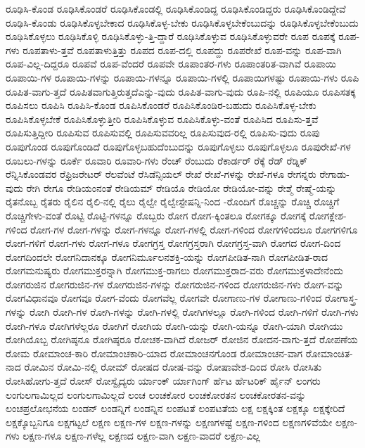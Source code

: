 {ರೂಢಿಸಿ-ಕೊಂಡ
ರೂಢಿಸಿಕೊಂಡರೆ
ರೂಢಿಸಿಕೊಂಡಲ್ಲಿ
ರೂಢಿಸಿಕೊಂಡಿದ್ದ
ರೂಢಿಸಿಕೊಂಡಿದ್ದರು
ರೂಢಿಸಿಕೊಂಡಿದ್ದೇವೆ
ರೂಢಿಸಿ-ಕೊಂಡು
ರೂಢಿಸಿಕೊಳ್ಳಬೇಕಾದ
ರೂಢಿಸಿಕೊಳ್ಳ-ಬೇಕು
ರೂಢಿಸಿಕೊಳ್ಳಬೇಕೆಂಬುದನ್ನು
ರೂಢಿಸಿಕೊಳ್ಳಬೇಕೆಂಬುದು
ರೂಢಿಸಿಕೊಳ್ಳಲು
ರೂಢಿಸಿಕೊಳ್ಳಿ
ರೂಢಿಸಿಕೊಳ್ಳು-ತ್ತಿ-ದ್ದಾರೆ
ರೂಢಿಸಿಕೊಳ್ಳುವ
ರೂಢಿಸಿಕೊಳ್ಳುವರೇ
ರೂಪ
ರೂಪಕ್ಕೆ
ರೂಪ-ಗಳು
ರೂಪತಾಳು-ತ್ತವೆ
ರೂಪತಾಳುತ್ತಿತ್ತು
ರೂಪದ
ರೂಪ-ದಲ್ಲಿ
ರೂಪದ್ದು
ರೂಪರೇಖೆ
ರೂಪ-ವನ್ನು
ರೂಪ-ವಾಗಿ
ರೂಪ-ವಿಲ್ಲ-ದಿದ್ದರೂ
ರೂಪವೆ
ರೂಪ-ವೆಂದರೆ
ರೂಪವೇ
ರೂಪಾಂತರ-ಗಳು
ರೂಪಾಂತರಿತ-ವಾಗಿವೆ
ರೂಪಾಯಿ
ರೂಪಾಯಿ-ಗಳ
ರೂಪಾಯಿ-ಗಳನ್ನು
ರೂಪಾಯಿ-ಗಳನ್ನೂ
ರೂಪಾಯಿ-ಗಳಲ್ಲಿ
ರೂಪಾಯಿಗಳಷ್ಟು
ರೂಪಾಯಿ-ಗಳು
ರೂಪಿ
ರೂಪಿತ-ವಾಗು-ತ್ತದೆ
ರೂಪಿತವಾಗುತ್ತಿರುತ್ತದೆಎನ್ನು-ವುದು
ರೂಪಿತ-ವಾಗು-ವುದು
ರೂಪಿ-ನಲ್ಲಿ
ರೂಪಿಯೂ
ರೂಪಿಸತಕ್ಕ
ರೂಪಿಸಲು
ರೂಪಿಸಿ
ರೂಪಿಸಿ-ಕೊಂಡ
ರೂಪಿಸಿಕೊಂಡರೆ
ರೂಪಿಸಿಕೊಂಡಿರ-ಬಹುದು
ರೂಪಿಸಿಕೊಳ್ಳ-ಬೇಕು
ರೂಪಿಸಿಕೊಳ್ಳಬೇಕೆ
ರೂಪಿಸಿಕೊಳ್ಳುತ್ತೀರಿ
ರೂಪಿಸಿಕೊಳ್ಳುವ
ರೂಪಿಸಿಕೊಳ್ಳು-ವಂತೆ
ರೂಪಿಸಿದ
ರೂಪಿಸು-ತ್ತವೆ
ರೂಪಿಸುತ್ತಿದ್ದೀರಿ
ರೂಪಿಸುವ
ರೂಪಿಸುವಲ್ಲಿ
ರೂಪಿಸುವವರಿಲ್ಲ
ರೂಪಿಸುವುದ-ರಲ್ಲಿ
ರೂಪಿಸು-ವುದು
ರೂಪು
ರೂಪುಗೊಂಡ
ರೂಪುಗೊಂಡಿದೆ
ರೂಪುಗೊಳ್ಳಬಹುದೆಂಬುದನ್ನು
ರೂಪುಗೊಳ್ಳಲು
ರೂಪುಗೊಳ್ಳಲೂ
ರೂಪುರೇಖೆ-ಗಳ
ರೂಬಲು-ಗಳನ್ನು
ರೂರ್ಕೆ
ರೂವಾರಿ
ರೂವಾರಿ-ಗಳು
ರೆಂಚ್
ರೆಂಬುದು
ರೆಕಾರ್ಡರ್
ರೆಕ್ಕೆ
ರೆಡ್
ರೆಡ್ನಿಕ್
ರೆನ್ನಿಸಿಕೊಂಡವರ
ರೆಫ್ರಿಜರೇಟರ್
ರೆಲವೆಂಟೆ
ರೆಸಿಡೆನ್ಸಿಯಲ್
ರೇಖೆ
ರೇಖೆ-ಗಳನ್ನು
ರೇಖೆ-ಗಳೂ
ರೇಗನ್ನರು
ರೇಗಾಡು-ವುದು
ರೇಗಿ
ರೇಗೂ
ರೇಡಿಯಂನಂತೆ
ರೇಡಿಯಮ್
ರೇಡಿಯೊ
ರೇಡಿಯೋ
ರೇಡಿಯೋ-ವನ್ನು
ರೇಶ್ಮೆ
ರೇಷ್ಮೆ-ಯನ್ನು
ರೈತನೊಬ್ಬ
ರೈತರು
ರೈಲಿನ
ರೈಲಿ-ನಲ್ಲಿ
ರೈಲು
ರೈಲ್ವೇ
ರೈಲ್ವೇಸ್ಟೇಷನ್ನಿ-ನಿಂದ
-ರೊಂದಿಗೆ
ರೊಚ್ಚನ್ನು
ರೊಚ್ಚಿ
ರೊಚ್ಚಿಗೆ
ರೊಚ್ಚಿಗೇಳು-ವಂತೆ
ರೊಟ್ಟಿ
ರೊಟ್ಟಿ-ಗಳನ್ನೂ
ರೊಬ್ಬರು
ರೋಗ
ರೋಗ-ಕ್ಕಿಂತಲೂ
ರೋಗಕ್ಕೂ
ರೋಗಕ್ಕೆ
ರೋಗಕ್ಲೇಶ-ಗಳಿಂದ
ರೋಗ-ಗಳ
ರೋಗ-ಗಳನ್ನು
ರೋಗ-ಗಳನ್ನೂ
ರೋಗ-ಗಳಲ್ಲಿ
ರೋಗ-ಗಳಿಂದ
ರೋಗಗಳಿಂದಲೂ
ರೋಗಗಳಿಗೂ
ರೋಗ-ಗಳಿಗೆ
ರೋಗ-ಗಳು
ರೋಗ-ಗಳೂ
ರೋಗಗ್ರಸ್ತ
ರೋಗಗ್ರಸ್ತರಾಗಿ
ರೋಗಗ್ರಸ್ತ-ವಾಗಿ
ರೋಗದ
ರೋಗ-ದಿಂದ
ರೋಗದಿಂದಲೇ
ರೋಗನಿದಾನಕ್ಕೂ
ರೋಗನಿರ್ಮೂಲನಶಕ್ತಿ-ಯನ್ನು
ರೋಗಪೀಡಿತ-ನಾಗಿ
ರೋಗಪೀಡಿತ-ರಾದ
ರೋಗಮನುಷ್ಯರು
ರೋಗಮುಕ್ತರನ್ನಾಗಿ
ರೋಗಮುಕ್ತ-ರಾಗಲು
ರೋಗಮುಕ್ತರಾದ-ವರು
ರೋಗಮುಕ್ತಳಾದೇನೆಂದು
ರೋಗರುಜಿನ
ರೋಗರುಜಿನ-ಗಳ
ರೋಗರುಜಿನ-ಗಳನ್ನು
ರೋಗರುಜಿನ-ಗಳಿಂದ
ರೋಗರುಜಿನ-ಗಳು
ರೋಗ-ವನ್ನು
ರೋಗವಿಧಾನವೂ
ರೋಗವೂ
ರೋಗ-ವೆಂದು
ರೋಗವೆಲ್ಲ
ರೋಗವೇ
ರೋಗಾಣು-ಗಳ
ರೋಗಾಣು-ಗಳಿಂದ
ರೋಗಾಸ್ತ್ರ-ಗಳನ್ನು
ರೋಗಿ
ರೋಗಿ-ಗಳ
ರೋಗಿ-ಗಳನ್ನು
ರೋಗಿ-ಗಳಲ್ಲಿ
ರೋಗಿಗಳಲ್ಲೂ
ರೋಗಿ-ಗಳಿಂದ
ರೋಗಿ-ಗಳಿಗೆ
ರೋಗಿ-ಗಳು
ರೋಗಿ-ಗಳೂ
ರೋಗಿಗಳೆಲ್ಲರೂ
ರೋಗಿಗೆ
ರೋಗಿಯ
ರೋಗಿ-ಯನ್ನು
ರೋಗಿ-ಯನ್ನೂ
ರೋಗಿ-ಯಾಗಿ
ರೋಗಿಯು
ರೋಗಿಯೊಬ್ಬ
ರೋಗಿಷ್ಠನೂ
ರೋಗಿಷ್ಠರೂ
ರೋಚಕ-ವಾಗಿದೆ
ರೋಜರ್
ರೋಜಿನ
ರೋದನ-ವಾಗು-ತ್ತದೆ
ರೋಪಣೆಯ
ರೋಮ
ರೋಮಾಂಚ-ಕಾರಿ
ರೋಮಾಂಚಕಾರಿ-ಯಾದ
ರೋಮಾಂಚನಗೊಂಡ
ರೋಮಾಂಚನ-ವಾಗ
ರೋಮಾಂಚಿತ-ನಾದ
ರೋಮಿನ
ರೋಮಿ-ನಲ್ಲಿ
ರೋಮ್
ರೋಷದ
ರೋಷ-ವನ್ನು
ರೋಷಾವೇಶ-ದಿಂದ
ರೋಸಿ
ರೋಸಿತು
ರೋಸಿಹೋಗು-ತ್ತದೆ
ರೋಸ್
ರೋಸ್ವೈದ್ಯರು
ರ್ಯಾಂಕ್
ರ್ಯಾಗಿಂಗ್
ರ್ಹೆಟ
ರ್ಹೆಟರಿಕ್
ರ್ಹೈನ್
ಲಂಗರು
ಲಂಗುಲಗಾಮಿಲ್ಲದ
ಲಂಗುಲಗಾಮಿಲ್ಲದೆ
ಲಂಚ
ಲಂಚಕೋರ
ಲಂಚಕೋರತನ
ಲಂಚಕೋರತನ-ವನ್ನು
ಲಂಚಪ್ರಲೋಭನೆಯ
ಲಂಡನ್
ಲಂಡನ್ನಿಗೆ
ಲಂಡನ್ನಿನ
ಲಂಪಟತೆ
ಲಂಪಟತೆಯ
ಲಕ್ಷ
ಲಕ್ಷಕ್ಕಿಂತ
ಲಕ್ಷಕ್ಕೂ
ಲಕ್ಷಕ್ಕೇರಿದೆ
ಲಕ್ಷಕ್ಕೊಬ್ಬನಿಗೂ
ಲಕ್ಷಗಟ್ಟಲೆ
ಲಕ್ಷಣ
ಲಕ್ಷಣ-ಗಳ
ಲಕ್ಷಣ-ಗಳನ್ನು
ಲಕ್ಷಣಗಳಷ್ಟೆ
ಲಕ್ಷಣ-ಗಳಿಂದ
ಲಕ್ಷಣಗಳಿವೆಯೇ
ಲಕ್ಷಣ-ಗಳು
ಲಕ್ಷಣ-ಗಳೂ
ಲಕ್ಷಣ-ಗಳೆಲ್ಲ
ಲಕ್ಷಣದ
ಲಕ್ಷಣ-ವಾಗಿ
ಲಕ್ಷಣ-ವಾದರೆ
ಲಕ್ಷಣ-ವಿಲ್ಲ
}
